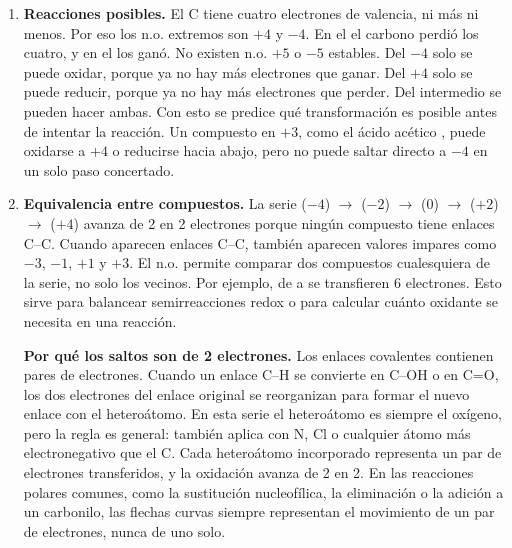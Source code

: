 \begin{enumerate}
    \item \textbf{Reacciones posibles.} El C tiene cuatro electrones de 
    valencia, ni más ni menos. Por eso los n.o. extremos son $+4$ y $-4$. 
    En el  el carbono perdió los cuatro, y en el  los 
    ganó. No existen n.o. $+5$ o $-5$ estables. Del $-4$ solo se puede 
    oxidar, porque ya no hay más electrones que ganar. Del $+4$ solo se 
    puede reducir, porque ya no hay más electrones que perder. Del 
    intermedio se pueden hacer ambas. Con esto se predice qué transformación 
    es posible antes de intentar la reacción. Un compuesto en $+3$, como 
    el ácido acético , puede oxidarse a $+4$ o reducirse 
    hacia abajo, pero no puede saltar directo a $-4$ en un solo paso 
    concertado.

    \item \textbf{Equivalencia entre compuestos.} La serie  
    ($-4$) $\to$  ($-2$) $\to$  ($0$) $\to$  
    ($+2$) $\to$  ($+4$) avanza de 2 en 2 electrones porque ningún 
    compuesto tiene enlaces C--C. Cuando aparecen enlaces C--C, también 
    aparecen valores impares como $-3$, $-1$, $+1$ y $+3$. El n.o. permite 
    comparar dos compuestos cualesquiera de la serie, no solo los vecinos. 
    Por ejemplo, de  a  se transfieren 6 electrones. Esto 
    sirve para balancear semirreacciones redox o para calcular cuánto 
    oxidante se necesita en una reacción.

    \textbf{Por qué los saltos son de 2 electrones.} Los enlaces covalentes 
    contienen pares de electrones. Cuando un enlace C--H se convierte en 
    C--OH o en C=O, los dos electrones del enlace original se reorganizan 
    para formar el nuevo enlace con el heteroátomo. En esta serie el 
    heteroátomo es siempre el oxígeno, pero la regla es general: también 
    aplica con N, Cl o cualquier átomo más electronegativo que el C. Cada 
    heteroátomo incorporado representa un par de electrones transferidos, 
    y la oxidación avanza de 2 en 2. En las reacciones polares comunes, 
    como la sustitución nucleofílica, la eliminación o la adición a un 
    carbonilo, las flechas curvas siempre representan el movimiento de un 
    par de electrones, nunca de uno solo.


\end{enumerate}
